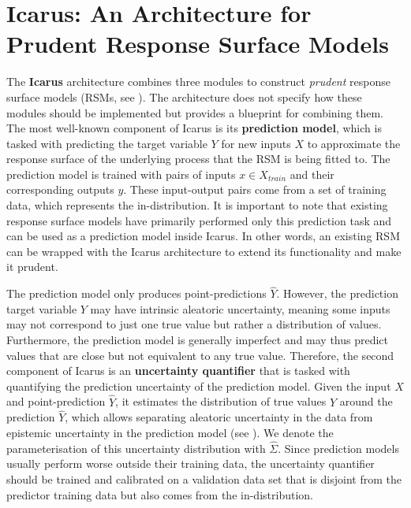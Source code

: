 \section{Icarus: An Architecture for Prudent Response Surface Models} \label{txt:icarus-rsm}

The \textbf{Icarus} architecture combines three modules to construct \textit{prudent} response surface models (RSMs, see ). The architecture does not specify how these modules should be implemented but provides a blueprint for combining them. The most well-known component of Icarus is its \textbf{prediction model}, which is tasked with predicting the target variable $Y$ for new inputs $X$ to approximate the response surface of the underlying process that the RSM is being fitted to. The prediction model is trained with pairs of inputs $x \in X_{train}$ and their corresponding outputs $y$. These input-output pairs come from a set of training data, which represents the in-distribution. It is important to note that existing response surface models have primarily performed only this prediction task and can be used as a prediction model inside Icarus. In other words, an existing RSM can be wrapped with the Icarus architecture to extend its functionality and make it prudent.

The prediction model only produces point-predictions $\hat{Y}$. However, the prediction target variable $Y$ may have intrinsic aleatoric uncertainty, meaning some inputs may not correspond to just one true value but rather a distribution of values. Furthermore, the prediction model is generally imperfect and may thus predict values that are close but not equivalent to any true value. Therefore, the second component of Icarus is an \textbf{uncertainty quantifier} that is tasked with quantifying the prediction uncertainty of the prediction model. Given the input $X$ and point-prediction $\hat{Y}$, it estimates the distribution of true values $Y$ around the prediction $\hat{Y}$, which allows separating aleatoric uncertainty in the data from epistemic uncertainty in the prediction model (see ). We denote the parameterisation of this uncertainty distribution with $\hat{\Sigma}$. Since prediction models usually perform worse outside their training data, the uncertainty quantifier should be trained and calibrated on a validation data set that is disjoint from the predictor training data but also comes from the in-distribution.

